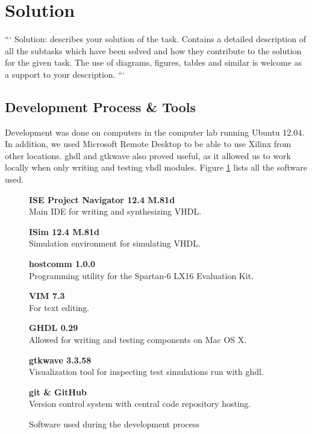 \section{Solution}

```
Solution: describes your solution of the task.
Contains a detailed description of all the subtasks which have been solved and how they contribute to the solution for the given task.
The use of diagrams, figures, tables and similar is welcome as a support to your description.
```

\subsection{Development Process \& Tools}

Development was done on computers in the computer lab running Ubuntu 12.04.
In addition, we used Microsoft Remote Desktop to be able to use Xilinx from other locations.
ghdl and gtkwave also proved useful, as it allowed us to work locally when only writing and testing vhdl modules. Figure \ref{fig:software} lists all the software used.

\begin{figure}[ht!]
    \begin{description}
        \item{\textbf{ISE Project Navigator 12.4 M.81d}} \\
            Main IDE for writing and synthesizing VHDL.
        \item{\textbf{ISim 12.4 M.81d}} \\
            Simulation environment for simulating VHDL.
        \item{\textbf{hostcomm 1.0.0}} \\
            Programming utility for the Spartan-6 LX16 Evaluation Kit.
        \item{\textbf{VIM 7.3}} \\
            For text editing.
        \item{\textbf{GHDL 0.29}} \\
            Allowed for writing and testing components on Mac OS X.
        \item{\textbf{gtkwave 3.3.58}} \\
            Visualization tool for inspecting test simulations run with ghdl.
        \item{\textbf{git \& GitHub}} \\
            Version control system with central code repository hosting.
    \label{fig:software}
    \end{description}
    \caption{Software used during the development process}
\end{figure}

